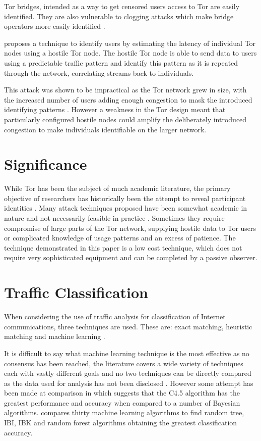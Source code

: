 \documentclass[conference]{IEEEtran}
\begin{document}
Tor bridges, intended as a way to get censored users access to Tor are easily
identified. They are also vulnerable to clogging attacks which make bridge
operators more easily identified \textcite{McLachlan:2009p197}.

\textcite{Murdoch:2005p325} proposes a technique to identify users by estimating
the latency of individual Tor nodes using a hostile Tor node. The hostile Tor
node is able to send data to users using a predictable traffic pattern and
identify this pattern as it is repeated through the network, correlating streams
back to individuals.

This attack was shown to be impractical as the Tor network grew in size, with
the increased number of users adding enough congestion to mask the introduced
identifying patterns \parencite{Evans:2009p315}. However a weakness in the Tor
design meant that particularly configured hostile nodes could amplify the
deliberately introduced congestion to make individuals identifiable on the
larger network.

\section{Significance}

While Tor has been the subject of much academic literature, the primary
objective of researchers has historically been the attempt to reveal participant
identities \parencite[3]{Murdoch:2005p325}.  Many attack techniques proposed
have been somewhat academic in nature and not necessarily feasible in practice
\parencite{Raccoon:2008fk}. Sometimes they require compromise of large parts of
the Tor network, supplying hostile data to Tor users or complicated knowledge of
usage patterns and an excess of patience. The technique demonstrated in this
paper is a low cost technique, which does not require very sophisticated
equipment and can be completed by a passive observer.

\section{Traffic Classification}

When considering the use of traffic analysis for classification of Internet
communications, three techniques are used. These are: exact matching, heuristic
matching and machine learning \parencite{Zhang:2009p1188}.

It is difficult to say what machine learning technique is the most effective as
no consensus has been reached, the literature covers a wide variety of
techniques each with vastly different goals and no two techniques can be
directly compared as the data used for analysis has not been disclosed
\parencite{Kim:2007p3867}. However some attempt has been made at comparison in
\textcite{Williams:2006p3849} which suggests that the C4.5 algorithm has the
greatest performance and accuracy when compared to a number of Bayesian
algorithms. \textcite{Mohd:2009p6484} compares thirty machine learning
algorithms to find random tree, IBI, IBK and random forest algorithms
obtaining the greatest classification accuracy.
\end{document}
